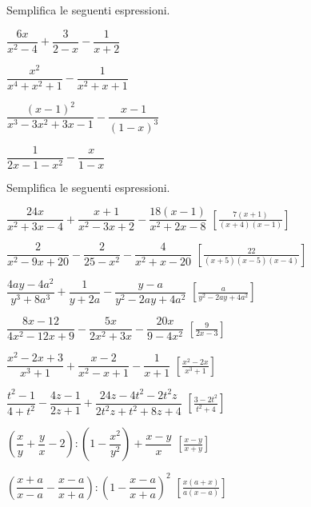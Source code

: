 \begin{esercizio}
\label{ese:19.34}
Semplifica le seguenti espressioni.
\begin{multicols}{2}
\begin{enumeratea}
 \item \(\dfrac{6x}{x^{2}-4}+\dfrac{3}{2-x}-\dfrac{1}{x+2}\)
 \item \(\dfrac{x^{2}}{x^{4}+x^{2}+1}-\dfrac{1}{x^{2}+x+1}\)
 \item \(\dfrac{(x-1)^{2}}{x^{3}-3x^{2}+3x-1}-\dfrac{x-1}{(1-x)^{3}}\)
 \item \(\dfrac{1}{2x-1-x^{2}}-\dfrac{x}{1-x}\)
\end{enumeratea}
\end{multicols}
\end{esercizio}

\begin{esercizio}[\Ast]
\label{ese:19.35}
Semplifica le seguenti espressioni.
\begin{enumeratea}
 \item \(\dfrac{24x}{x^{2}+3x-4}+\dfrac{x+1}{x^{2}-3x+2}-\dfrac{18(x-1)}{x^{2}+2x-8}\)
  \hfill \(\left[\frac{7(x+1)}{(x+4)(x-1)}\right]\)
 \item \(\dfrac{2}{x^{2}-9x+20}-\dfrac{2}{25-x^{2}}-\dfrac{4}{x^{2}+x-20}\)
  \hfill \(\left[\frac{22}{(x+5)(x-5)(x-4)}\right]\)
 \item \(\dfrac{4ay-4a^{2}}{y^{3}+8a^{3}}+\dfrac{1}{y+2a}-\dfrac{y-a}{y^{2}-2ay+4a^{2}}\)
  \hfill \(\left[\frac{a}{y^{2}-2ay+4a^{2}}\right]\)
 \item \(\dfrac{8x-12}{4x^{2}-12x+9}-\dfrac{5x}{2x^{2}+3x}-\dfrac{20x}{9-4x^{2}}\)
  \hfill \(\left[\frac{9}{2x-3}\right]\)
 \item \(\dfrac{x^{{2}}-2x+3}{x^{{3}}+1}+\dfrac{x-2}{x^{{2}}-x+1}-\dfrac{1}{x+1}\)
  \hfill \(\left[\frac{x^{2}-2x}{x^{3}+1}\right]\)
 \item \(\dfrac{t^{2}-1}{4+t^{2}}-\dfrac{4z-1}{2z+1}+
        \dfrac{24z-4t^{2}-2t^{2}z}{2t^{2}z+t^{2}+8z+4}\)
  \hfill \(\left[\frac{3-2t^{2}}{t^{2}+4}\right]\)
 \item \(\left(\dfrac{x}{y}+\dfrac{y}{x}-2\right):\left(1-
        \dfrac{x^{2}}{y^{2}}\right)+\dfrac{x-y}{x}\)
  \hfill \(\left[\frac{x-y}{x+y}\right]\)
 \item \(\left(\dfrac{x+a}{x-a}-\dfrac{x-a}{x+a}\right):
        \left(1-\dfrac{x-a}{x+a}\right)^{2}\)
  \hfill \(\left[\frac{x(a+x)}{a(x-a)}\right]\)
\end{enumeratea}
\end{esercizio}

